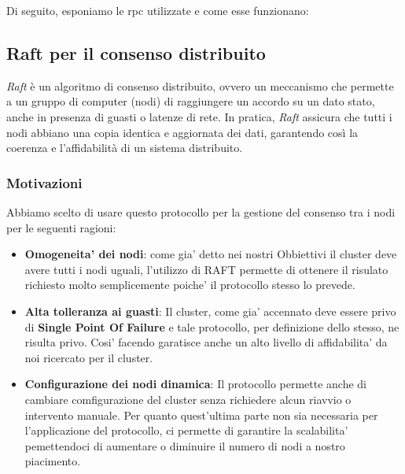 Di seguito, esponiamo le rpc utilizzate e come esse funzionano:

\subsection{Raft per il consenso distribuito}
\textit{Raft} è un algoritmo di consenso distribuito, ovvero un meccanismo che permette 
a un gruppo di computer (nodi) di raggiungere un accordo su un dato stato, 
anche in presenza di guasti o latenze di rete. In pratica, 
\textit{Raft} assicura che tutti i nodi abbiano una copia identica e 
aggiornata dei dati, garantendo così la coerenza e l'affidabilità di un sistema distribuito.

\subsubsection{Motivazioni}
Abbiamo scelto di usare questo protocollo per la gestione del consenso tra i nodi per
le seguenti ragioni:
\begin{itemize}
    \item \textbf{Omogeneita' dei nodi}: 
        come gia' detto nei nostri Obbiettivi il cluster deve avere tutti i nodi uguali, 
        l'utilizzo di RAFT permette di ottenere il risulato richiesto molto semplicemente poiche'
        il protocollo stesso lo prevede.
    \item \textbf{Alta tolleranza ai guasti}: 
        Il cluster, come gia' accennato deve essere privo di \textbf{Single Point Of Failure} e
        tale protocollo, per definizione dello stesso, ne risulta privo. 
        Cosi' facendo garatisce anche un alto livello di affidabilita' da noi ricercato per il 
        cluster.
    \item \textbf{Configurazione dei nodi dinamica}: 
        Il protocollo permette anche di cambiare comfigurazione del cluster senza richiedere
        alcun riavvio o intervento manuale. Per quanto quest'ultima
        parte non sia necessaria per l'applicazione del protocollo, ci permette di garantire
        la scalabilita' pemettendoci di aumentare o diminuire il numero di 
        nodi a nostro piacimento.
\end{itemize}


